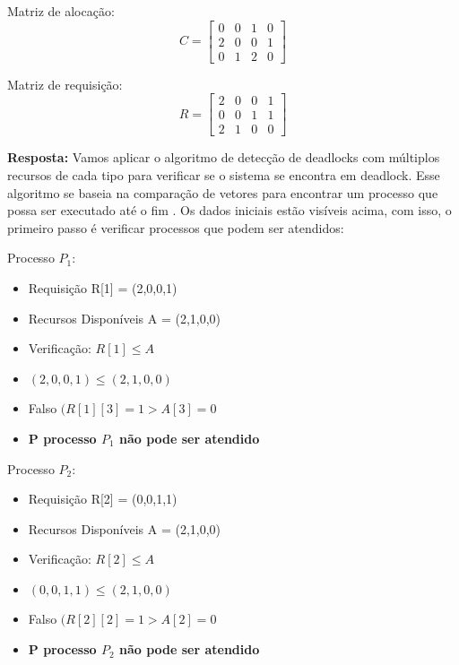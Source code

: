 \documentclass{article}
\begin{document}
Matriz de alocação:\newline
\[C =
\begin{bmatrix}
  0 & 0 & 1 & 0\\
  2 & 0 & 0 & 1\\
  0 & 1 & 2 & 0
\end{bmatrix}
\]

Matriz de requisição:\newline
\[R =
\begin{bmatrix}
  2 & 0 & 0 & 1\\
  0 & 0 & 1 & 1\\
  2 & 1 & 0 & 0
\end{bmatrix}
\]

\textbf{Resposta:}  Vamos aplicar o algoritmo de detecção de deadlocks com múltiplos recursos de cada tipo para verificar se o sistema se encontra em deadlock. Esse algoritmo se baseia na comparação de vetores para encontrar um processo que possa ser executado até o fim \parencite[p. 309]{tanenbaum2021}. Os dados iniciais estão visíveis acima, com isso, o primeiro passo é verificar processos que podem ser atendidos:
\newline

Processo $P_1:$
\begin{itemize}
  \item Requisição R[1] = (2,0,0,1)
  \item Recursos Disponíveis A = (2,1,0,0)
  \item Verificação: $R[1] \leq A$
  \item $(2,0,0,1) \leq (2,1,0,0)$
  \item Falso $(R[1][3]=1 > A[3]=0$
  \item \textbf{P processo $P_1$ não pode ser atendido}\newline
\end{itemize}


Processo $P_2:$
\begin{itemize}
  \item Requisição R[2] = (0,0,1,1)
  \item Recursos Disponíveis A = (2,1,0,0)
  \item Verificação: $R[2] \leq A$
  \item $(0,0,1,1) \leq (2,1,0,0)$
  \item Falso $(R[2][2]=1 > A[2]=0$
  \item \textbf{P processo $P_2$ não pode ser atendido}\newline
\end{itemize}
\end{document}
